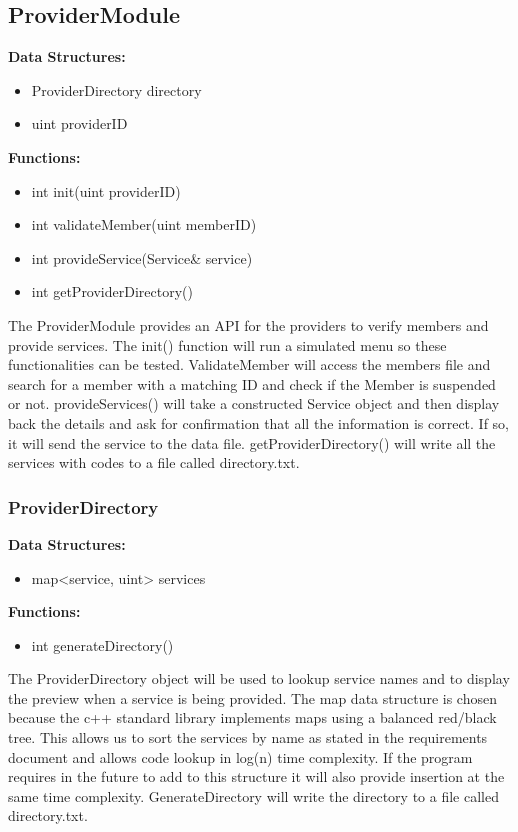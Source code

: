 \documentclass{article}
\begin{document}
\subsection{ProviderModule}
\textbf{Data Structures:}
\begin{itemize}
   \item ProviderDirectory directory
   \item uint providerID
\end{itemize}
\textbf{Functions:}
\begin{itemize}
   \item int init(uint providerID)
   \item int validateMember(uint memberID)
   \item int provideService(Service\& service)
   \item int getProviderDirectory()
\end{itemize}
The ProviderModule provides an API for the providers to verify members and provide services. The init() function will run a simulated menu so these functionalities can be tested. ValidateMember will access the members file and search for a member with a matching ID and check if the Member is suspended or not. provideServices() will take a constructed Service object and then display back the details and ask for confirmation that all the information is correct. If so, it will send the service to the data file. getProviderDirectory() will write all the services with codes to a file called directory.txt.

\subsubsection{ProviderDirectory}
\textbf{Data Structures:}
\begin{itemize}
   \item map<service, uint> services
\end{itemize}
\textbf{Functions:}
\begin{itemize}
   \item int generateDirectory()
\end{itemize}
The ProviderDirectory object will be used to lookup service names and to display the preview when a service is being provided. The map data structure is chosen because the c++ standard library implements maps using a balanced red/black tree. This allows us to sort the services by name as stated in the requirements document and allows code lookup in log(n) time complexity. If the program requires in the future to add to this structure it will also provide insertion at the same time complexity. GenerateDirectory will write the directory to a file called directory.txt.
\end{document}
